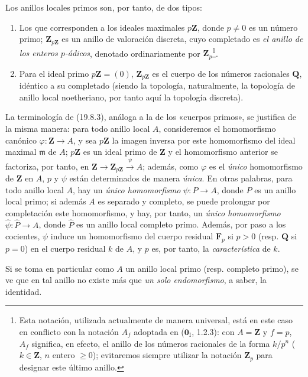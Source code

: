 \documentclass[10pt,oneside]{book}
\begin{document}
Los anillos locales primos son, por tanto, de dos tipos:
\begin{enumerate}
  \item[$1^{\mathrm o}$] Los que corresponden a los ideales maximales
  $p\mathbf Z$, donde $p\neq0$ es un número primo; $\mathbf Z_{p\mathbf Z}$
  es un anillo de valoración discreta, cuyo completado es \emph{el anillo de los
  enteros $p$-ádicos}, denotado ordinariamente por $\mathbf Z_p$\footnote{Esta notación,
  utilizada actualmente de manera universal, está en este caso en conflicto con la
  notación $A_f$ adoptada en ($\mathbf 0_{\mathrm I}$, 1.2.3): con
  $A=\mathbf Z$ y $f=p$, $A_f$ significa, en efecto, el anillo de los números
  racionales de la forma $k/p^n$ ($k\in\mathbf Z$, $n$ entero $\geq0$);
  evitaremos siempre utilizar la notación $\mathbf Z_p$ para designar este
  último anillo.}.
  \item[$2^{\mathrm o}$] Para el ideal primo $p\mathbf Z=(0)$,
  $\mathbf Z_{p\mathbf Z}$ es el cuerpo de los números racionales $\mathbf Q$,
  idéntico a su completado (siendo la topología, naturalmente, la topología
  de anillo local noetheriano, por tanto aquí la topología discreta).
\end{enumerate}

La terminología de (19.8.3), análoga a la de los «cuerpos primos», se
justifica de la misma manera: para todo anillo local $A$, consideremos
el homomorfismo canónico $\varphi:\mathbf Z\to A$, y sea $p\mathbf Z$
la imagen inversa por este homomorfismo del ideal maximal $\mathfrak m$ de
$A$; $p\mathbf Z$ es un ideal primo de $\mathbf Z$ y el homomorfismo
anterior se factoriza, por tanto, en
$\mathbf Z\to\mathbf Z_{p\mathbf Z}\xrightarrow{\psi}A$; además, como
$\varphi$ es el \emph{único} homomorfismo de $\mathbf Z$ en $A$, $p$ y
$\psi$ están determinados de manera \emph{única}. En otras palabras, para todo anillo
local $A$, hay un \emph{único homomorfismo} $\psi:P\to A$, donde $P$ es un
anillo local primo; si además $A$ es separado y completo, se puede prolongar
por completación este homomorfismo, y hay, por tanto, un \emph{único
homomorfismo} $\widehat\psi:\widehat P\to A$, donde $\widehat P$ es un anillo
local completo primo. Además, por paso a los cocientes, $\psi$ induce un
homomorfismo del cuerpo residual $\mathbf F_p$ si $p>0$ (resp. $\mathbf Q$ si
$p=0$) en el cuerpo residual $k$ de $A$, y $p$ es, por tanto, la
\emph{característica} de $k$.

Si se toma en particular como $A$ un anillo local primo (resp. completo
primo), se ve que en tal anillo no existe más que \emph{un solo
endomorfismo}, a saber, la identidad.
\end{document}
